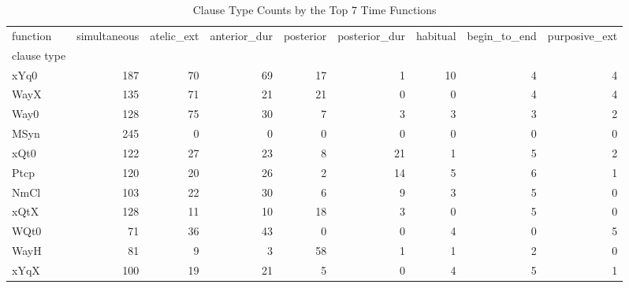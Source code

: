 \begin{table}[htbp!]
\centering
\caption{Clause Type Counts by the Top 7 Time Functions}
\label{table:type_function_ct}
\begin{adjustbox}{width=1\textwidth}
\begin{tabular}{lrrrrrrrr}
\toprule
function &  simultaneous &  atelic\_ext &  anterior\_dur &  posterior &  posterior\_dur &  habitual &  begin\_to\_end &  purposive\_ext \\
clause type &               &             &               &            &                &           &               &                \\
\midrule
xYq0        &           187 &          70 &            69 &         17 &              1 &        10 &             4 &              4 \\
WayX        &           135 &          71 &            21 &         21 &              0 &         0 &             4 &              4 \\
Way0        &           128 &          75 &            30 &          7 &              3 &         3 &             3 &              2 \\
MSyn        &           245 &           0 &             0 &          0 &              0 &         0 &             0 &              0 \\
xQt0        &           122 &          27 &            23 &          8 &             21 &         1 &             5 &              2 \\
Ptcp        &           120 &          20 &            26 &          2 &             14 &         5 &             6 &              1 \\
NmCl        &           103 &          22 &            30 &          6 &              9 &         3 &             5 &              0 \\
xQtX        &           128 &          11 &            10 &         18 &              3 &         0 &             5 &              0 \\
WQt0        &            71 &          36 &            43 &          0 &              0 &         4 &             0 &              5 \\
WayH        &            81 &           9 &             3 &         58 &              1 &         1 &             2 &              0 \\
xYqX        &           100 &          19 &            21 &          5 &              0 &         4 &             5 &              1 \\

\end{tabular}
\end{adjustbox}
\end{table}
